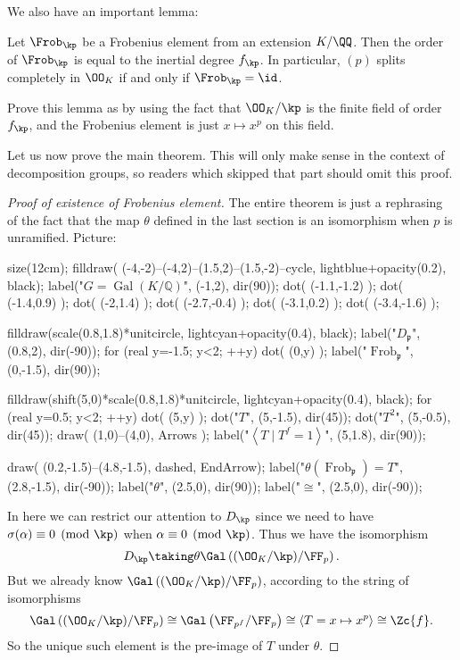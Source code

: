 We also have an important lemma:
\begin{lemma}
	Let $\Frob_\kp$ be a Frobenius element from an extension $K/\QQ$.
	Then the order of $\Frob_\kp$ is equal to the inertial degree $f_\kp$.
	In particular, $(p)$ splits completely in $\OO_K$
	if and only if $\Frob_\kp = \id$.
\end{lemma}
\begin{exercise}
	Prove this lemma as by using the fact that $\OO_K / \kp$
	is the finite field of order $f_\kp$,
	and the Frobenius element is just $x \mapsto x^p$ on this field.
\end{exercise}

Let us now prove the main theorem.
This will only make sense in the context of decomposition groups,
so readers which skipped that part should omit this proof.
\begin{proof}
	[Proof of existence of Frobenius element]
	The entire theorem is just a rephrasing of the fact
	that the map $\theta$ defined in the last section
	is an isomorphism when $p$ is unramified.
	Picture:
	\begin{center}
		\begin{asy}
			size(12cm);
			filldraw( (-4,-2)--(-4,2)--(1.5,2)--(1.5,-2)--cycle, lightblue+opacity(0.2), black);
			label("$G = \operatorname{Gal}(K/\mathbb Q)$", (-1,2), dir(90));
			dot( (-1.1,-1.2) );
			dot( (-1.4,0.9) );
			dot( (-2,1.4) );
			dot( (-2.7,-0.4) );
			dot( (-3.1,0.2) );
			dot( (-3.4,-1.6) );

			filldraw(scale(0.8,1.8)*unitcircle, lightcyan+opacity(0.4), black);
			label("$D_{\mathfrak p}$", (0.8,2), dir(-90));
			for (real y=-1.5; y<2; ++y) { dot( (0,y) ); }
			label("$\operatorname{Frob}_{\mathfrak p}$", (0,-1.5), dir(90));

			filldraw(shift(5,0)*scale(0.8,1.8)*unitcircle, lightcyan+opacity(0.4), black);
			for (real y=0.5; y<2; ++y) { dot( (5,y) ); }
			dot("$T$", (5,-1.5), dir(45));
			dot("$T^2$", (5,-0.5), dir(45));
			draw( (1,0)--(4,0), Arrows );
			label("$\left<T \mid T^f=1\right>$", (5,1.8), dir(90));

			draw( (0.2,-1.5)--(4.8,-1.5), dashed, EndArrow);
			label("$\theta(\operatorname{Frob}_{\mathfrak p}) = T$", (2.8,-1.5), dir(-90));
			label("$\theta$", (2.5,0), dir(90));
			label("$\cong$", (2.5,0), dir(-90));
		\end{asy}
	\end{center}
	In here we can restrict our attention to $D_\kp$
	since we need to have $\sigma(\alpha) \equiv 0 \pmod \kp$
	when $\alpha \equiv 0 \pmod \kp$.
	Thus we have the isomorphism
	\[ D_\kp \taking\theta \Gal\left( (\OO_K/\kp) / \FF_p \right). \]
	But we already know $\Gal\left( (\OO_K/\kp)/\FF_p \right)$,
	according to the string of isomorphisms
	\[
		\Gal\left( (\OO_K/\kp) / \FF_p \right)
		\cong \Gal\left( \FF_{p^f} / \FF_p \right)
		\cong \left< T = x \mapsto x^p \right>
		\cong \Zc{f} .
	\]
	So the unique such element is the pre-image of $T$ under $\theta$.
\end{proof}



